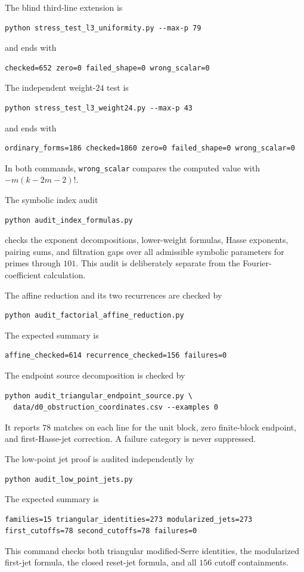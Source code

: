 The blind third-line extension is
\begin{verbatim}
python stress_test_l3_uniformity.py --max-p 79
\end{verbatim}
and ends with
\begin{verbatim}
checked=652 zero=0 failed_shape=0 wrong_scalar=0
\end{verbatim}
The independent weight-$24$ test is
\begin{verbatim}
python stress_test_l3_weight24.py --max-p 43
\end{verbatim}
and ends with
\begin{verbatim}
ordinary_forms=186 checked=1860 zero=0 failed_shape=0 wrong_scalar=0
\end{verbatim}
In both commands, \texttt{wrong\_scalar} compares the computed value with
$-m(k-2m-2)!$.

The symbolic index audit
\begin{verbatim}
python audit_index_formulas.py
\end{verbatim}
checks the exponent decompositions, lower-weight formulas, Hasse exponents,
pairing sums, and filtration gaps over all admissible symbolic parameters
for primes through $101$.  This audit is deliberately separate from the
Fourier-coefficient calculation.

The affine reduction and its two recurrences are checked by
\begin{verbatim}
python audit_factorial_affine_reduction.py
\end{verbatim}
The expected summary is
\begin{verbatim}
affine_checked=614 recurrence_checked=156 failures=0
\end{verbatim}
The endpoint source decomposition is checked by
\begin{verbatim}
python audit_triangular_endpoint_source.py \
  data/d0_obstruction_coordinates.csv --examples 0
\end{verbatim}
It reports $78$ matches on each line for the unit block, zero finite-block
endpoint, and first-Hasse-jet correction.  A failure category is never
suppressed.

The low-point jet proof is audited independently by
\begin{verbatim}
python audit_low_point_jets.py
\end{verbatim}
The expected summary is
\begin{verbatim}
families=15 triangular_identities=273 modularized_jets=273
first_cutoffs=78 second_cutoffs=78 failures=0
\end{verbatim}
This command checks both triangular modified-Serre identities, the
modularized first-jet formula, the closed reset-jet formula, and all $156$
cutoff containments.

